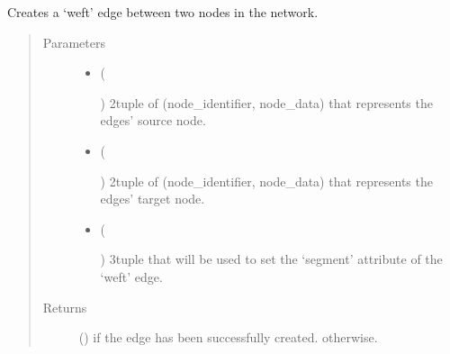 \documentclass[letterpaper,10pt,english]{sphinxmanual}
\begin{document}
\begin{fulllineitems}
\begin{fulllineitems}
\label{\detokenize{cockatoo:cockatoo.KnitNetworkBase.create_weft_edge}}
Creates a ‘weft’ edge between two nodes in the network.
\begin{quote}\begin{description}
\item[{Parameters}] \leavevmode\begin{itemize}
\item {} 
 (%
\begin{footnote}[81]\sphinxAtStartFootnote
{}
%
\end{footnote}) \textendash{} 2\sphinxhyphen{}tuple of (node\_identifier, node\_data) that represents the edges’
source node.

\item {} 
 (%
\begin{footnote}[82]\sphinxAtStartFootnote
{}
%
\end{footnote}) \textendash{} 2\sphinxhyphen{}tuple of (node\_identifier, node\_data) that represents the edges’
target node.

\item {} 
 (%
\begin{footnote}[83]\sphinxAtStartFootnote
{}
%
\end{footnote}) \textendash{} 3\sphinxhyphen{}tuple that will be used to set the ‘segment’ attribute of the
‘weft’ edge.

\end{itemize}

\item[{Returns}] \leavevmode
{} () \textendash{}  if the edge has been successfully created.
 otherwise.


\end{description}
\end{quote}
\end{fulllineitems}
\end{fulllineitems}
\end{document}
